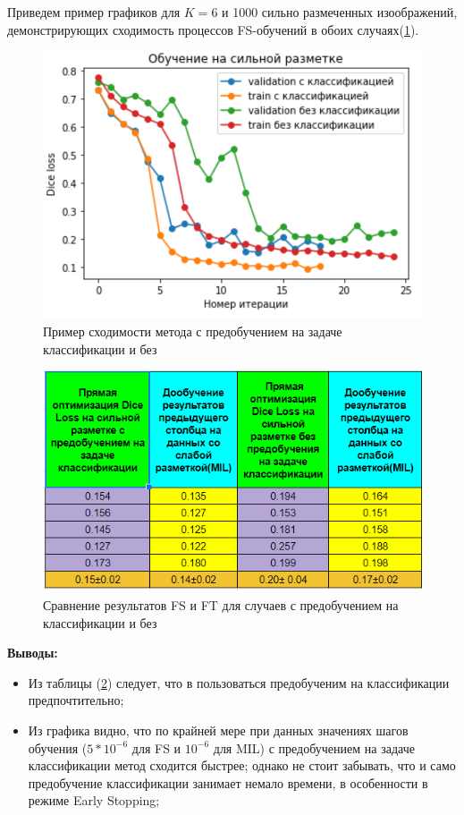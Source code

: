 \noindent Приведем пример графиков для $K = 6$ и 1000 сильно размеченных изоображений, демонстрирующих сходимость процессов FS-обучений в обоих случаях(\ref{fig:cmp_class_no_class}).

\begin{figure}[h!] 
  \center
  \includegraphics [scale=0.8] {images/cmp_class_no_class.png}
  \caption{ Пример сходимости метода с предобучением на задаче классификации и без} \label{fig:cmp_class_no_class}
\end{figure}

\begin{figure}[ht] 
  \center
  \includegraphics [scale=0.78] {images/shortcut.png}
  \caption{ Сравнение результатов FS и FT для случаев с предобучением на классификации и без} 
  \label{fig:cmp_pretrain}  
\end{figure}

{\bf Выводы:}

\begin{itemize}
    \item Из таблицы  (\ref{fig:cmp_pretrain}) следует, что в пользоваться предобученим на классификации предпочтительно;
    \item Из графика видно, что по крайней мере при данных значениях шагов обучения ($5*10^{-6}$ для FS и $10^{-6}$ для MIL) с предобучением на задаче классификации метод сходится быстрее; однако не стоит забывать, что и само предобучение классификации занимает немало времени, в особенности в режиме Early Stopping;

\end{itemize}

